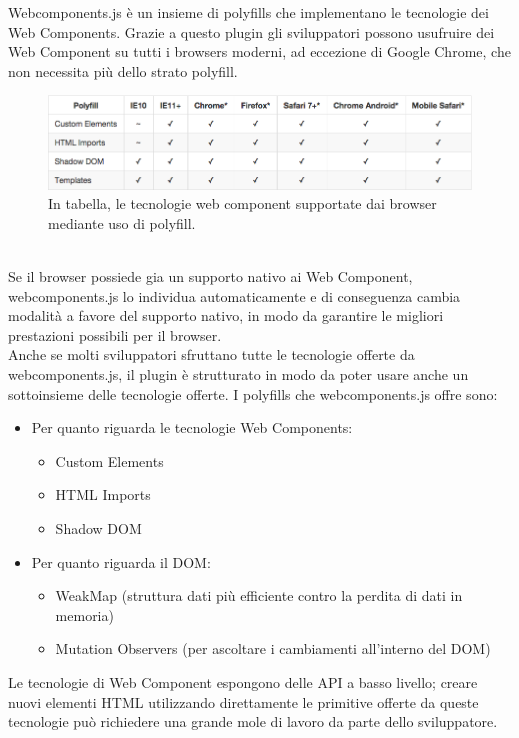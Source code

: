 Webcomponents.js è un insieme di polyfills che implementano le tecnologie dei Web Components. Grazie a questo plugin gli sviluppatori possono usufruire dei Web Component su tutti i browsers moderni, ad eccezione di Google Chrome, che non necessita più dello strato polyfill.
\\
\begin{figure}[htb]
 \centering
 \includegraphics[width=1\linewidth]{images/chapter_tecnologie_abilitanti/tecnologie_abilitanti_polyfill.png}\hfill
 \caption[Supporto ai polyfill]{In tabella, le tecnologie web component supportate dai browser mediante uso di polyfill.}
 \label{fig:tecnologie_abilitanti_polyfill}
\end{figure}
\\
Se il browser possiede gia un supporto nativo ai Web Component, webcomponents.js lo individua automaticamente e di conseguenza cambia modalità a favore del supporto nativo, in modo da garantire le migliori prestazioni possibili per il browser.
\\
Anche se molti sviluppatori sfruttano tutte le tecnologie offerte da webcomponents.js, il plugin è strutturato in modo da poter usare anche un sottoinsieme delle tecnologie offerte. 
I polyfills che webcomponents.js offre sono:
\begin{itemize}
\item Per quanto riguarda le tecnologie Web Components:
\begin{itemize} 
\item Custom Elements
\item HTML Imports
\item Shadow DOM
\end{itemize}
\item Per quanto riguarda il DOM:
\begin{itemize}
\item WeakMap (struttura dati più efficiente contro la perdita di dati in memoria)
\item Mutation Observers (per ascoltare i cambiamenti all’interno del DOM)
\end{itemize}
\end{itemize}
Le tecnologie di Web Component espongono delle API a basso livello; creare nuovi elementi HTML utilizzando direttamente le primitive offerte da queste tecnologie può richiedere una grande mole di lavoro da parte dello sviluppatore. 
